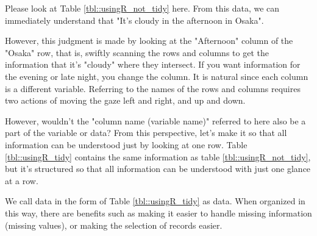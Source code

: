 \documentclass{ltjsbook}
\begin{document}
Please look at Table \ref{tbl::usingR_not_tidy} here. From this data, we can immediately understand that "It's cloudy in the afternoon in Osaka".

However, this judgment is made by looking at the "Afternoon" column of the "Osaka" row, that is, swiftly scanning the rows and columns to get the information that it's "cloudy" where they intersect. If you want information for the evening or late night, you change the column. It is natural since each column is a different variable. Referring to the names of the rows and columns requires two actions of moving the gaze left and right, and up and down.

However, wouldn't the "column name (variable name)" referred to here also be a part of the variable or data? From this perspective, let's make it so that all information can be understood just by looking at one row. Table \ref{tbl::usingR_tidy} contains the same information as table \ref{tbl::usingR_not_tidy}, but it's structured so that all information can be understood with just one glance at a row.



We call data in the form of Table \ref{tbl::usingR_tidy} as  data.
When organized in this way, there are benefits such as making it easier to handle missing information (missing values), or making the selection of records easier.
\end{document}
